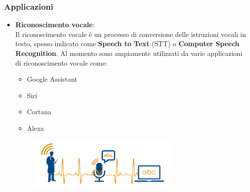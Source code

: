 \begin{frame}
	
	\frametitle{Applicazioni}
		\begin{itemize}
			\item \textbf{Riconoscimento vocale}:\\
				Il riconoscimento vocale è un processo di conversione delle istruzioni vocali in testo, spesso indicato come \textbf{Speech to Text} (STT) o \textbf{Computer Speech Recognition}. Al momento sono ampiamente utilizzati da varie applicazioni di riconoscimento vocale come:
				 	\begin{itemize}
				 		\item Google Assistant
				 		\item Siri
				 		\item Cortana
				 		\item Alexa
				 	\end{itemize}
			\begin{figure}[!htbp]
				\centering
				\includegraphics[width=7.5cm]{images/intro/speech_recognition.png}
			\end{figure}
			
		\end{itemize}		

\end{frame}


